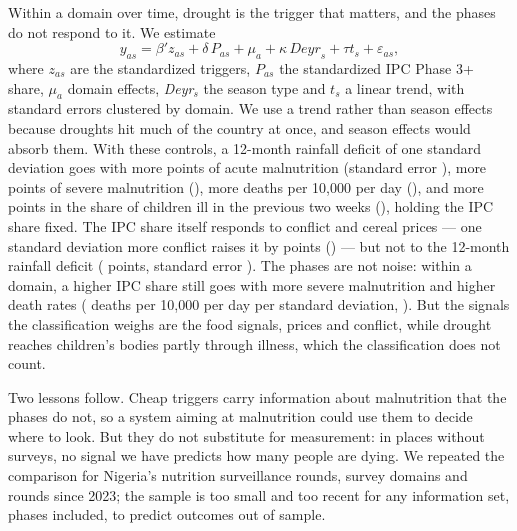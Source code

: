 \documentclass[11pt]{article}
\begin{document}
Within a domain over time, drought is the trigger that matters, and the phases do not respond to it. We estimate
\begin{equation}\label{eq:within}
y_{as} = \beta' z_{as} + \delta\, P_{as} + \mu_a + \kappa\, \textit{Deyr}_s + \tau t_s + \varepsilon_{as},
\end{equation}
where $z_{as}$ are the standardized triggers, $P_{as}$ the standardized IPC Phase 3+ share, $\mu_a$ domain effects, \textit{Deyr}$_s$ the season type and $t_s$ a linear trend, with standard errors clustered by domain. We use a trend rather than season effects because droughts hit much of the country at once, and season effects would absorb them. With these controls, a 12-month rainfall deficit of one standard deviation goes with \twGamDry{} more points of acute malnutrition (standard error \twGamDrySe{}), \twSamDry{} more points of severe malnutrition (\twSamDrySe{}), \twCdrDry{} more deaths per 10,000 per day (\twCdrDrySe{}), and \twMorbDry{} more points in the share of children ill in the previous two weeks (\twMorbDrySe{}), holding the IPC share fixed. The IPC share itself responds to conflict and cereal prices --- one standard deviation more conflict raises it by \tpFat{} points (\tpFatSe{}) --- but not to the 12-month rainfall deficit (\tpDry{} points, standard error \tpRainyrSe{}). The phases are not noise: within a domain, a higher IPC share still goes with more severe malnutrition and higher death rates (\twCdrPthree{} deaths per 10,000 per day per standard deviation, \twCdrPthreeSe{}). But the signals the classification weighs are the food signals, prices and conflict, while drought reaches children's bodies partly through illness, which the classification does not count.

Two lessons follow. Cheap triggers carry information about malnutrition that the phases do not, so a system aiming at malnutrition could use them to decide where to look. But they do not substitute for measurement: in places without surveys, no signal we have predicts how many people are dying. We repeated the comparison for Nigeria's nutrition surveillance rounds, \ngN{} survey domains and rounds since 2023; the sample is too small and too recent for any information set, phases included, to predict outcomes out of sample.
\end{document}
